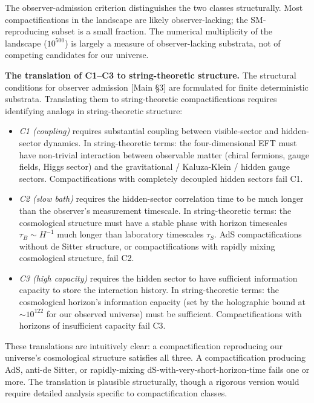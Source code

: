 \documentclass[
]{article}
\begin{document}
The observer-admission criterion distinguishes the two classes
structurally. Most compactifications in the landscape are likely
observer-lacking; the SM-reproducing subset is a small fraction. The
numerical multiplicity of the landscape (\(10^{500}\)) is largely a
measure of observer-lacking substrata, not of competing candidates for
our universe.

\textbf{The translation of C1--C3 to string-theoretic structure.} The
structural conditions for observer admission {[}Main §3{]} are
formulated for finite deterministic substrata. Translating them to
string-theoretic compactifications requires identifying analogs in
string-theoretic structure:

\begin{itemize}
\item
  \emph{C1 (coupling)} requires substantial coupling between
  visible-sector and hidden-sector dynamics. In string-theoretic terms:
  the four-dimensional EFT must have non-trivial interaction between
  observable matter (chiral fermions, gauge fields, Higgs sector) and
  the gravitational / Kaluza-Klein / hidden gauge sectors.
  Compactifications with completely decoupled hidden sectors fail C1.
\item
  \emph{C2 (slow bath)} requires the hidden-sector correlation time to
  be much longer than the observer's measurement timescale. In
  string-theoretic terms: the cosmological structure must have a stable
  phase with horizon timescales \(\tau_B \sim H^{-1}\) much longer than
  laboratory timescales \(\tau_S\). AdS compactifications without de
  Sitter structure, or compactifications with rapidly mixing
  cosmological structure, fail C2.
\item
  \emph{C3 (high capacity)} requires the hidden sector to have
  sufficient information capacity to store the interaction history. In
  string-theoretic terms: the cosmological horizon's information
  capacity (set by the holographic bound at \(\sim 10^{122}\) for our
  observed universe) must be sufficient. Compactifications with horizons
  of insufficient capacity fail C3.
\end{itemize}

These translations are intuitively clear: a compactification reproducing
our universe's cosmological structure satisfies all three. A
compactification producing AdS, anti-de Sitter, or rapidly-mixing
dS-with-very-short-horizon-time fails one or more. The translation is
plausible structurally, though a rigorous version would require detailed
analysis specific to compactification classes.
\end{document}
